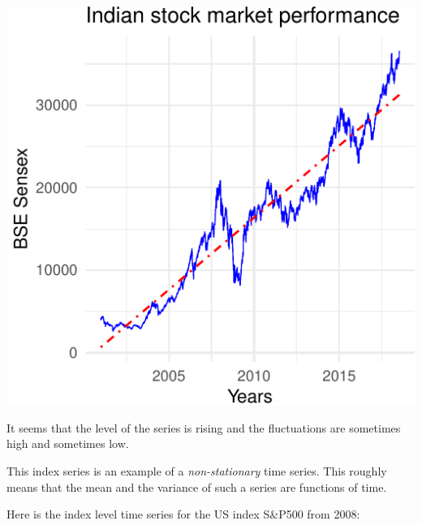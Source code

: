 \documentclass[11pt,]{article}
\begin{document}
\begin{center}\includegraphics{FMC_T4_PhD_Fin_Time_Series_files/figure-latex/BSE-2} \end{center}

It seems that the level of the series is rising and the fluctuations are
sometimes high and sometimes low.

This index series is an example of a \emph{non-stationary} time series.
This roughly means that the mean and the variance of such a series are
functions of time.

Here is the index level time series for the US index S\&P500 from 2008:
\end{document}
